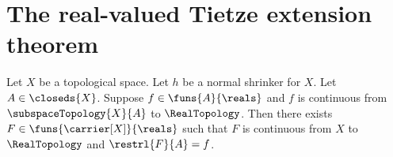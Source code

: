 



\section{The real-valued Tietze extension theorem}

\begin{theorem}\label{tietze_extension_real_from_normal_shrinker}
    Let $X$ be a topological space.
    Let $h$ be a normal shrinker for $X$.
    Let $A\in\closeds{X}$.
    Suppose $f\in\funs{A}{\reals}$ and $f$ is continuous from
        $\subspaceTopology{X}{A}$ to $\RealTopology$.
    Then there exists $F\in\funs{\carrier[X]}{\reals}$ such that
        $F$ is continuous from $X$ to $\RealTopology$ and
        $\restrl{F}{A}=f$.
\end{theorem}
